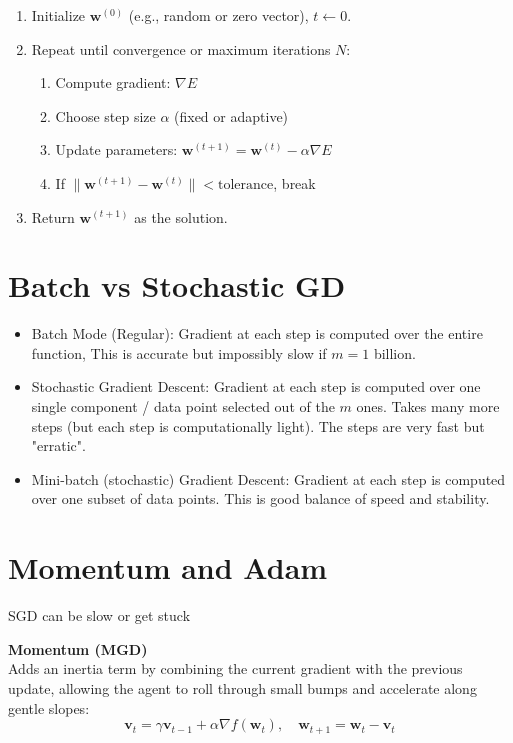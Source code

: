 \begin{enumerate}[label=\arabic*.]
    \item Initialize $\mathbf{w}^{(0)}$ (e.g., random or zero vector), $t \gets 0$.
    \item Repeat until convergence or maximum iterations $N$:
    \begin{enumerate}[label=\alph*)]
        \item Compute gradient: $\nabla E$
        \item Choose step size $\alpha$ (fixed or adaptive)
        \item Update parameters: $\mathbf{w}^{(t+1)} = \mathbf{w}^{(t)} - \alpha \nabla E$
        \item If $\|\mathbf{w}^{(t+1)} - \mathbf{w}^{(t)}\| < \text{tolerance}$, break
    \end{enumerate}
    \item Return $\mathbf{w}^{(t+1)}$ as the solution.
\end{enumerate}

\section*{Batch vs Stochastic GD}

\begin{itemize}
    \item Batch Mode (Regular): Gradient at each step is computed over the entire function,
    This is accurate but impossibly slow if $m = 1$ billion.
    \item Stochastic Gradient Descent: Gradient at each step is
    computed over one single component / data point selected out of the $m$ ones.
    Takes many more steps (but each step is computationally light). The steps are very fast but "erratic".
    \item Mini-batch (stochastic) Gradient Descent: Gradient at each step is computed
    over one subset of data points. This is good balance of speed and stability.
\end{itemize}

\section*{Momentum and Adam}

SGD can be slow or get stuck

\textbf{Momentum (MGD)}\\
Adds an inertia term by combining the current gradient with the previous update, allowing the agent to roll through small bumps and accelerate along gentle slopes:
\[
\mathbf{v}_t = \gamma \mathbf{v}_{t-1} + \alpha \nabla f(\mathbf{w}_t), \quad
\mathbf{w}_{t+1} = \mathbf{w}_t - \mathbf{v}_t
\]


